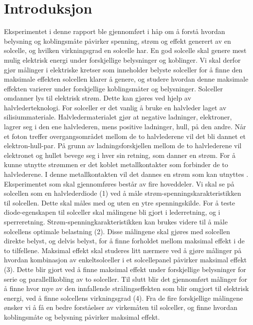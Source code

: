 \documentclass[%
 reprint,
 amsmath,amssymb,
 aps,
 norsk,
 booktabs
]{revtex4-1}
\begin{document}
\section{Introduksjon}
Eksperimentet i denne rapport ble gjennomført i håp om å forstå hvordan belysning og koblingsmåte påvirker spenning, strøm og effekt generert av en solcelle, og hvilken virkningsgrad en solcelle har. En god solcelle skal genere mest mulig elektrisk energi under forskjellige belysninger og koblinger. Vi skal derfor gjør målinger i elektriske kretser som inneholder belyste solceller for å finne den maksimale effekten solcellen klarer å genere, og studere hvordan denne maksimale effekten varierer under forskjellige koblingsmåter og belysninger.
Solceller omdanner lys til elektrisk strøm. Dette kan gjøres ved hjelp av halvlederteknologi. For solceller er det vanlig å bruke en halvleder laget av silisiummateriale. Halvledermaterialet gjør at negative ladninger, elektroner, lagrer seg i den ene halvlederen, mens positive ladninger, hull, på den andre. Når et foton treffer overgangsområdet mellom de to halvlederene vil det bli dannet et elektron-hull-par. På grunn av ladningsforskjellen mellom de to halvlederene vil elektronet og hullet bevege seg i hver sin retning, som danner en strøm. For å kunne utnytte strømmen er det koblet metallkontakter som forbinder de to halvlederene. I denne metallkontakten vil det dannes en strøm som kan utnyttes \cite{snl}.\\
Eksperimentet som skal gjennomføres består av fire hoveddeler. Vi skal se på solcellen som en halvlederdiode (1) ved å måle strøm-spenningskarakteristikken til solcellen. Dette skal måles med og uten en ytre spenningskilde. For å teste diode-egenskapen til solceller skal målingene bli gjort i lederretning, og i sperreretning. Strøm-spenningkarakteristikken kan brukes videre til å måle solcellens optimale belastning (2). Disse målingene skal gjøres med solcellen direkte belyst, og delvis belyst, for å finne forholdet mellom maksimal effekt i de to tilfellene. Maksimal effekt skal studeres litt nærmere ved å gjøre målinger på hvordan kombinasjon av enkeltsolceller i et solcellepanel påvirker maksimal effekt (3). Dette blir gjort ved å finne maksimal effekt under forskjellige belysninger for serie og parallellkobling av to solceller. Til slutt blir det gjennomført målinger for å finne hvor mye av den innfallende strålingseffekten som blir omgjort til elektrisk energi, ved å finne solcellens virkningsgrad (4). Fra de fire forskjellige målingene ønsker vi å få en bedre forståelser av virkemåten til solceller, og finne hvordan koblingsmåte og belysning påvirker maksimal effekt. \\
\end{document}
